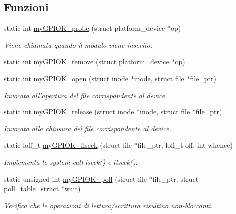 \subsection*{Funzioni}
\begin{DoxyCompactItemize}
\item 
static int \hyperlink{group___linux-_driver_gae40973a06d72f7c41a9af07513a62307}{my\+G\+P\+I\+O\+K\+\_\+probe} (struct platform\+\_\+device $\ast$op)
\begin{DoxyCompactList}\small\item\em Viene chiamata quando il modulo viene inserito. \end{DoxyCompactList}\item 
static int \hyperlink{group___linux-_driver_ga59fddfaa36dea357f4bbdfceb0f47f8c}{my\+G\+P\+I\+O\+K\+\_\+remove} (struct platform\+\_\+device $\ast$op)
\item 
static int \hyperlink{group___linux-_driver_gad013759c18fbf6ea96005b9b3bfa5b4e}{my\+G\+P\+I\+O\+K\+\_\+open} (struct inode $\ast$inode, struct file $\ast$file\+\_\+ptr)
\begin{DoxyCompactList}\small\item\em Invocata all'apertura del file corrispondente al device. \end{DoxyCompactList}\item 
static int \hyperlink{group___linux-_driver_ga17ce7f574723246c790b70b06e3e7103}{my\+G\+P\+I\+O\+K\+\_\+release} (struct inode $\ast$inode, struct file $\ast$file\+\_\+ptr)
\begin{DoxyCompactList}\small\item\em Invocata alla chiusura del file corrispondente al device. \end{DoxyCompactList}\item 
static loff\+\_\+t \hyperlink{group___linux-_driver_ga66e7f726b72320a272b633ecbaecefff}{my\+G\+P\+I\+O\+K\+\_\+llseek} (struct file $\ast$file\+\_\+ptr, loff\+\_\+t off, int whence)
\begin{DoxyCompactList}\small\item\em Implementa le system-\/call lseek() e llseek(). \end{DoxyCompactList}\item 
static unsigned int \hyperlink{group___linux-_driver_gaba935e8a8215c2ebce9a7147fd4f5147}{my\+G\+P\+I\+O\+K\+\_\+poll} (struct file $\ast$file\+\_\+ptr, struct poll\+\_\+table\+\_\+struct $\ast$wait)
\begin{DoxyCompactList}\small\item\em Verifica che le operazioni di lettura/scrittura risultino non-\/bloccanti. \end{DoxyCompactList}\item 

\end{DoxyCompactItemize}
